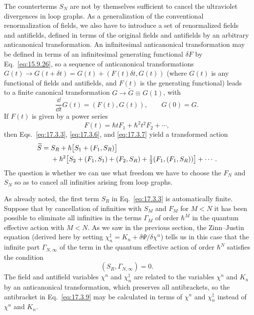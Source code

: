 The counterterms $S_N$ are not by themselves sufficient to cancel the
ultraviolet divergences in loop graphs. As a generalization of the
conventional renormalization of fields, we also have to introduce a set of
renormalized fields and antifields, defined in terms of the original fields
and antifields by an arbitrary anticanonical transformation. An infinitesimal
anticanonical transformation may be defined in terms of an infinitesimal
generating functional $\delta F$ by Eq.~\eqref{eq:15.9.26}, so a sequence of
anticanonical transformations
$G(t)\longrightarrow G(t+\delta t)=G(t)+(F(t)\delta t,G(t))$ (where $G(t)$
is any functional of fields and antifields, and $F(t)$ is the generating
functional) leads to a finite canonical transformation
$G\longrightarrow\widetilde G\equiv G(1)$, with
\begin{equation}
\frac{\dd}{\dd t}G(t)=(F(t),G(t)),
\qquad G(0)=G.
\label{eq:17.3.6}
\end{equation}
If $F(t)$ is given by a power series
\begin{equation}
F(t)=\hbar tF_1+\hbar^2t^2F_2+\cdots,
\label{eq:17.3.7}
\end{equation}
then Eqs.~\eqref{eq:17.3.3}, \eqref{eq:17.3.6}, and \eqref{eq:17.3.7}
yield a transformed action
\begin{align}
\widetilde S={}&S_R+\hbar\bigl[S_1+(F_1,S_R)\bigr] \notag\\
&+\hbar^2\bigl[S_2+(F_1,S_1)+(F_2,S_R)
+\tfrac12(F_1,(F_1,S_R))\bigr]+\cdots.
\label{eq:17.3.8}
\end{align}
The question is whether we can use what freedom we have to choose the $F_N$
and $S_N$ so as to cancel all infinities arising from loop graphs.

As already noted, the first term $S_R$ in Eq.~\eqref{eq:17.3.3} is
automatically finite. Suppose that by cancellation of infinities with $S_M$
and $F_M$ for $M<N$ it has been possible to eliminate all infinities in the
terms $\Gamma_M$ of order $\hbar^M$ in the quantum effective action with
$M<N$. As we saw in the previous section, the Zinn--Justin equation (derived
here by setting $\chi_n^{\ddagger}=K_n+\delta\Psi/\delta\chi^n$) tells us in
this case that the infinite part $\Gamma_{N,\infty}$ of the term in the
quantum effective action of order $\hbar^N$ satisfies the condition
\begin{equation}
(S_R,\Gamma_{N,\infty})=0.
\label{eq:17.3.9}
\end{equation}
The field and antifield variables $\chi^n$ and $\chi_n^{\ddagger}$ are related
to the variables $\chi^n$ and $K_n$ by an anticanonical transformation, which
preserves all antibrackets, so the antibracket in Eq.~\eqref{eq:17.3.9} may be
calculated in terms of $\chi^n$ and $\chi_n^{\ddagger}$ instead of $\chi^n$
and $K_n$.

